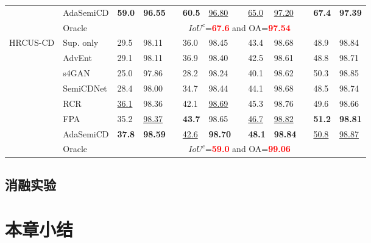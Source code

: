 \documentclass[lang=chs, degree=master, blindreview=false, adobe=false]{yanputhesis}
\begin{document}
\begin{table}[!htbp]
{\begin{tabular}{p{20mm}p{20mm}p{8mm}p{8mm}cp{8mm}p{8mm}cp{8mm}p{8mm}cp{8mm}p{8mm}}
      \rowcolor{mycyan}
      \multirow{-8}{*}{\cellcolor{white}}& \cellcolor{white}AdaSemiCD   &   \textbf{59.0} & \textbf{96.55} && \textbf{60.5} & \cellcolor{white}\underline{96.80} & \cellcolor{white} & \cellcolor{white}\underline{65.0} & \cellcolor{white}\underline{97.20} & \cellcolor{white}& \textbf{67.4} & \textbf{97.39} \\%
      \cline{2-13}
      & Oracle & \multicolumn{11}{c}{$ IoU^c$=\textcolor{red}{\bf 67.6} and OA=\textcolor{red}{\bf 97.54}} \\
      \bottomrule
      \multirow{8}{*}{HRCUS-CD}
      & Sup. only   &   29.5 & 98.11 && 36.0 & 98.45 && 43.4 & 98.68 && 48.9 & 98.84 \\ %
      & AdvEnt\cite{vu2019advent}& 29.1 & 98.11 && 36.9 & 98.40 && 42.5 & 98.61 && 48.8 & 98.71 \\ %
      & s4GAN\cite{mittal2019semi}& 25.0 & 97.86 && 28.2 & 98.24 && 40.1 & 98.62 && 50.3 & 98.85 \\
      & SemiCDNet\cite{peng2021SemiCDNet} & 28.4 & 98.00 && 34.7 & 98.44 && 44.1 & 98.68 && 48.5 & 98.74 \\ %
      & RCR\cite{bandara2022RCR}& \underline{36.1} & 98.36 && 42.1 & \underline{98.69} && 45.3 & 98.76 && 49.6 & 98.66 \\

      & FPA\cite{Zhang2023FPA}& 35.2 & \underline{98.37} && \cellcolor{mycyan}\textbf{43.7} & 98.65 && \underline{46.7} & \underline{98.82} && \cellcolor{mycyan}\textbf{51.2} & \textbf{98.81} \\

      \rowcolor{mycyan}
      \multirow{-8}{*}{\cellcolor{white}}& \cellcolor{white}AdaSemiCD   &  \textbf{37.8} & \cellcolor{mycyan}\textbf{98.59} && \cellcolor{white}\underline{42.6} & \textbf{98.70} && \textbf{48.1} & \textbf{98.84} && \cellcolor{white}\underline{50.8} & \underline{98.87} \\%
      \cline{2-13}
      & Oracle & \multicolumn{11}{c}{$ IoU^c$=\textcolor{red}{\bf 59.0} and OA=\textcolor{red}{\bf 99.06}} \\
      \bottomrule
  \end{tabular}
  }
  \label{tab:AdaTh-building}
\end{table}
\subsection{消融实验}
\section{本章小结}
\end{document}
